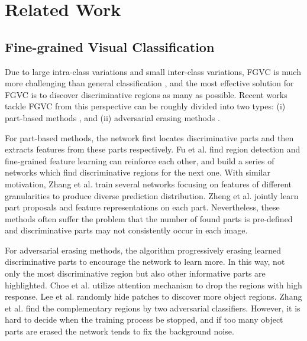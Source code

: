 \documentclass{article}
\begin{document}
\section{Related Work}













\subsection{Fine-grained Visual Classification} Due to large intra-class variations and small inter-class variations, FGVC is much more challenging than general classification \cite{fu2017look,zhang2019learning}, and the most effective solution for FGVC is to discover discriminative regions as many as possible. Recent works tackle FGVC from this perspective can be roughly divided into two types: (i) part-based methods \cite{zheng2017learning,yang2018learning,wang2018learning,ma2019fine,chen2019destruction}, and (ii) adversarial erasing methods \cite{Choe_2019_CVPR,8237643,Zhang_2018_CVPR}.

For part-based methods, the network first locates discriminative parts and then extracts features from these parts respectively. Fu et al. \cite{fu2017look} find region detection and fine-grained feature learning can reinforce each other, and build a series of networks which find discriminative regions for the next one. With similar motivation, Zhang et al. \cite{zhang2019learning} train several networks focusing on features of different granularities to produce diverse prediction distribution. Zheng et al. \cite{zheng2017learning} jointly learn part proposals and feature representations on each part. Nevertheless, these methods often suffer the problem that the number of found parts is pre-defined and discriminative parts may not consistently occur in each image. 

For adversarial erasing methods, the algorithm progressively erasing learned discriminative parts to encourage the network to learn more. In this way, not only the most discriminative region but also other informative parts are highlighted. Choe et al. \cite{Choe_2019_CVPR} utilize attention mechanism to drop the regions with high response. Lee et al. \cite{8237643} randomly hide patches to discover more object regions. Zhang et al. \cite{Zhang_2018_CVPR} find the complementary regions by two adversarial classifiers. However, it is hard to decide when the training process be stopped, and if too many object parts are erased the network tends to fix the background noise. 
\end{document}
